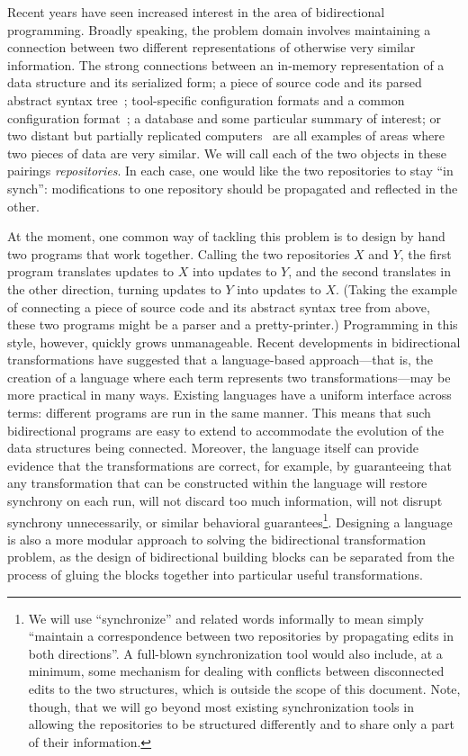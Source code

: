 Recent years have seen increased interest in the area of bidirectional
programming. Broadly speaking, the problem domain involves maintaining a
connection between two different representations of otherwise very similar
information. The strong connections between an in-memory representation of a
data structure and its serialized form; a piece of source code and its
parsed abstract syntax tree~\cite{rendel2010invertible}; tool-specific
configuration formats and a common configuration format~\cite{Augeas}; a
database and some particular summary of interest; or two distant but
partially replicated computers~\cite{pierce2004unison} are all examples of
areas where two pieces of data are very similar. We will call each of the
two objects in these pairings \emph{repositories}. In each case, one would
like the two repositories to stay ``in synch'': modifications to one
repository should be propagated and reflected in the other.

At the moment, one common way of tackling this problem is to design by hand
two programs that work together. Calling the two repositories $X$ and $Y$,
the first program translates updates to $X$ into updates to $Y$, and the
second translates in the other direction, turning updates to $Y$ into
updates to $X$. (Taking the example of connecting a piece of source code and
its abstract syntax tree from above, these two programs might be a parser
and a pretty-printer.) Programming in this style, however, quickly grows
unmanageable. Recent developments in bidirectional transformations have
suggested that a language-based approach---that is, the creation of a
language where each term represents two transformations---may be more
practical in many ways. Existing languages have a uniform interface across
terms: different programs are run in the same manner. This means that such
bidirectional programs are easy to extend to accommodate the evolution of
the data structures being connected. Moreover, the language itself can
provide evidence that the transformations are correct, for example, by
guaranteeing that any transformation that can be constructed within the
language will restore synchrony on each run, will not discard too much
information, will not disrupt synchrony unnecessarily, or similar behavioral
guarantees\footnote{We will use ``synchronize'' and related words informally
to mean simply ``maintain a correspondence between two repositories by
propagating edits in both directions''. A full-blown synchronization tool
would also include, at a minimum, some mechanism for dealing with conflicts
between disconnected edits to the two structures, which is outside the scope
of this document. Note, though, that we will go beyond most existing
synchronization tools in allowing the repositories to be structured
differently and to share only a part of their information.}. Designing a
language is also a more modular approach to solving the bidirectional
transformation problem, as the design of bidirectional building blocks can
be separated from the process of gluing the blocks together into particular
useful transformations.

